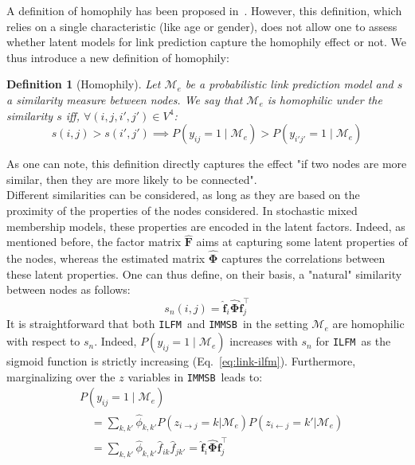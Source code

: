 \documentclass[journal]{IEEEtran}
\newcommand{\ifm}{\texttt{ILFM}}
\newcommand{\imb}{\texttt{IMMSB}}
\newcommand{\pr}{P}
\newcommand{\mat}[1]{\mathbf{#1}}
\newtheorem{definition}{Definition}[section]
\begin{document}
A definition of homophily has been proposed in~\cite{la2010randomization}. However, this definition, which relies on a single characteristic (like age or gender), does not allow one to assess whether latent models for link prediction capture the homophily effect or not. We thus introduce a new definition of homophily:~\\
%
\begin{definition}[Homophily] \label{def:homophily}
	Let $\mathcal{M}_e$ be a probabilistic link prediction model and $s$ a similarity measure between nodes. We say that $\mathcal{M}_e$ is homophilic under the similarity $s$ iff, $\forall (i,j,i',j') \in V^4$:
%
\begin{equation}
s(i,j) > s(i',j')  \implies \pr(y_{ij}=1 \mid \mathcal{M}_e) > \pr(y_{i'j'}=1  \mid \mathcal{M}_e) \nonumber
\end{equation}
%
\end{definition}
%
\noindent As one can note, this definition directly captures the effect "if two nodes are more similar, then they are more likely to be connected". ~\\

Different similarities can be considered, as long as they are based on the proximity of the properties of the nodes considered. In stochastic mixed membership models, these properties are encoded in the latent factors. Indeed, as mentioned before, the factor matrix $\mat{\hat{F}}$ aims at capturing some latent properties of the nodes, whereas the estimated matrix $\mat{\hat{\Phi}}$ captures the correlations between these latent properties. One can thus define, on their basis, a "natural" similarity between nodes as follows:
%
\begin{equation}
s_n(i,j) = \mat{\hat{f}}_{i} \mat{\hat{\Phi}} \mat{\hat{f}}_j^\top \nonumber
\end{equation}
%
It is straightforward that both \ifm\ and \imb\ in the setting $\mathcal{M}_e$ are homophilic with respect to $s_n$. Indeed, $\pr(y_{ij}=1 \mid \mathcal{M}_e)$ increases with $s_n$ for \ifm\ as the sigmoid function is strictly increasing (Eq.~\ref{eq:link-ilfm}). Furthermore, marginalizing over the $z$ variables in \imb\ leads to:
%
\begin{align}
&\pr(y_{ij} =1 \mid \mathcal{M}_e) \nonumber \\
& \quad = \sum_{k,k'} \hat{\phi}_{k,k'} \pr(z_{i \rightarrow j}=k | \mathcal{M}_e) \pr(z_{i \leftarrow j}=k' | \mathcal{M}_e) \nonumber \\
& \quad= \sum_{k,k'} \hat{\phi}_{k,k'} \hat{f}_{ik} \hat{f}_{jk'} = \mat{\hat{f}}_{i} \mat{\hat{\Phi}} \mat{\hat{f}}_j^\top \nonumber
\end{align}
\end{document}

